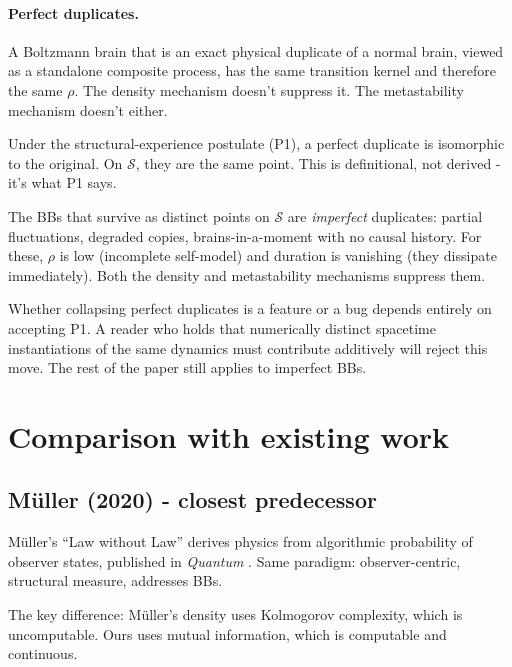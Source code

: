 \documentclass[12pt]{article}
\theoremstyle{remark}
\begin{document}
\paragraph{Perfect duplicates.} A Boltzmann brain that is an exact physical duplicate of a normal brain, viewed as a standalone composite process, has the same transition kernel and therefore the same $\rho$. The density mechanism doesn't suppress it. The metastability mechanism doesn't either.

Under the structural-experience postulate (P1), a perfect duplicate is isomorphic to the original. On $\mathcal{S}$, they are the same point. This is definitional, not derived - it's what P1 says.

The BBs that survive as distinct points on $\mathcal{S}$ are \emph{imperfect} duplicates: partial fluctuations, degraded copies, brains-in-a-moment with no causal history. For these, $\rho$ is low (incomplete self-model) and duration is vanishing (they dissipate immediately). Both the density and metastability mechanisms suppress them.

Whether collapsing perfect duplicates is a feature or a bug depends entirely on accepting P1. A reader who holds that numerically distinct spacetime instantiations of the same dynamics must contribute additively will reject this move. The rest of the paper still applies to imperfect BBs.



\section{Comparison with existing work}\label{sec:comparison}

\subsection{M\"uller (2020) - closest predecessor}

M\"uller's ``Law without Law'' derives physics from algorithmic probability of observer states, published in \emph{Quantum} \cite{mueller2020}. Same paradigm: observer-centric, structural measure, addresses BBs.

The key difference: M\"uller's density uses Kolmogorov complexity, which is uncomputable. Ours uses mutual information, which is computable and continuous.
\end{document}
